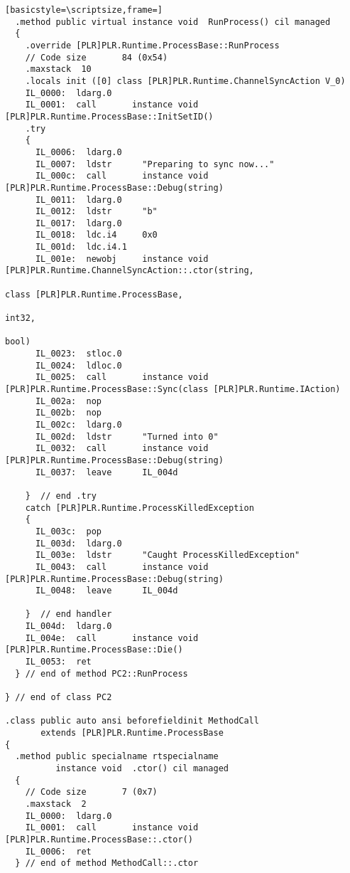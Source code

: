 \begin{lstlisting}[basicstyle=\scriptsize,frame=]
  .method public virtual instance void  RunProcess() cil managed
  {
    .override [PLR]PLR.Runtime.ProcessBase::RunProcess
    // Code size       84 (0x54)
    .maxstack  10
    .locals init ([0] class [PLR]PLR.Runtime.ChannelSyncAction V_0)
    IL_0000:  ldarg.0
    IL_0001:  call       instance void [PLR]PLR.Runtime.ProcessBase::InitSetID()
    .try
    {
      IL_0006:  ldarg.0
      IL_0007:  ldstr      "Preparing to sync now..."
      IL_000c:  call       instance void [PLR]PLR.Runtime.ProcessBase::Debug(string)
      IL_0011:  ldarg.0
      IL_0012:  ldstr      "b"
      IL_0017:  ldarg.0
      IL_0018:  ldc.i4     0x0
      IL_001d:  ldc.i4.1
      IL_001e:  newobj     instance void [PLR]PLR.Runtime.ChannelSyncAction::.ctor(string,
                                                                                   class [PLR]PLR.Runtime.ProcessBase,
                                                                                   int32,
                                                                                   bool)
      IL_0023:  stloc.0
      IL_0024:  ldloc.0
      IL_0025:  call       instance void [PLR]PLR.Runtime.ProcessBase::Sync(class [PLR]PLR.Runtime.IAction)
      IL_002a:  nop
      IL_002b:  nop
      IL_002c:  ldarg.0
      IL_002d:  ldstr      "Turned into 0"
      IL_0032:  call       instance void [PLR]PLR.Runtime.ProcessBase::Debug(string)
      IL_0037:  leave      IL_004d

    }  // end .try
    catch [PLR]PLR.Runtime.ProcessKilledException 
    {
      IL_003c:  pop
      IL_003d:  ldarg.0
      IL_003e:  ldstr      "Caught ProcessKilledException"
      IL_0043:  call       instance void [PLR]PLR.Runtime.ProcessBase::Debug(string)
      IL_0048:  leave      IL_004d

    }  // end handler
    IL_004d:  ldarg.0
    IL_004e:  call       instance void [PLR]PLR.Runtime.ProcessBase::Die()
    IL_0053:  ret
  } // end of method PC2::RunProcess

} // end of class PC2

.class public auto ansi beforefieldinit MethodCall
       extends [PLR]PLR.Runtime.ProcessBase
{
  .method public specialname rtspecialname 
          instance void  .ctor() cil managed
  {
    // Code size       7 (0x7)
    .maxstack  2
    IL_0000:  ldarg.0
    IL_0001:  call       instance void [PLR]PLR.Runtime.ProcessBase::.ctor()
    IL_0006:  ret
  } // end of method MethodCall::.ctor


\end{lstlisting}
